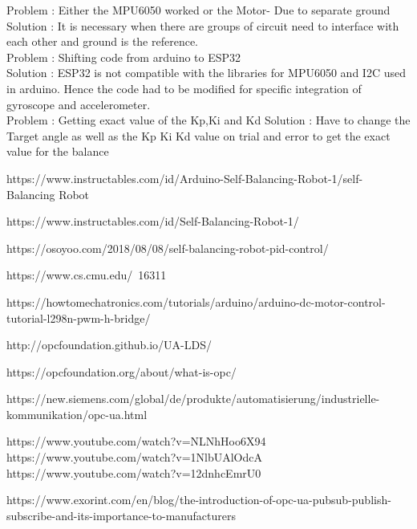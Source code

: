 \documentclass{article}
\begin{document}
  Problem : Either the MPU6050 worked or the Motor- Due to separate ground\\
  Solution : It is necessary when there are groups of circuit need to interface with each other and ground is the reference. \\
  
  Problem : Shifting code from arduino to ESP32\\
  Solution : ESP32 is not compatible with the libraries for MPU6050 and I2C used in arduino. Hence the code had to be modified for specific integration of gyroscope and accelerometer.\\
    
  Problem : Getting exact value of the Kp,Ki and Kd
  Solution : Have to change the Target angle as well as the Kp Ki Kd value on trial and error to get the exact value for the balance
    	
 	\pagebreak
 	\begin{thebibliography}{9}
 		{https://www.instructables.com/id/Arduino-Self-Balancing-Robot-1/}{self-Balancing Robot}
 		
 		{https://www.instructables.com/id/Self-Balancing-Robot-1/}
 		
 		{https://osoyoo.com/2018/08/08/self-balancing-robot-pid-control/}
 		
 		{https://www.cs.cmu.edu/~16311}
 		 
 		 {https://howtomechatronics.com/tutorials/arduino/arduino-dc-motor-control-tutorial-l298n-pwm-h-bridge/}
 		 
 		 {http://opcfoundation.github.io/UA-LDS/}
 		 
 		 {https://opcfoundation.org/about/what-is-opc/}
 		 
 		 {https://new.siemens.com/global/de/produkte/automatisierung/industrielle-kommunikation/opc-ua.html}
 		 
 		 {https://www.youtube.com/watch?v=NLNhHoo6X94}
 		 {https://www.youtube.com/watch?v=1NlbUAlOdcA}
 		 {https://www.youtube.com/watch?v=12dnhcEmrU0}
 		
 		{https://www.exorint.com/en/blog/the-introduction-of-opc-ua-pubsub-publish-subscribe-and-its-importance-to-manufacturers}
 		
 	\end{thebibliography}
 	
\end{document}

